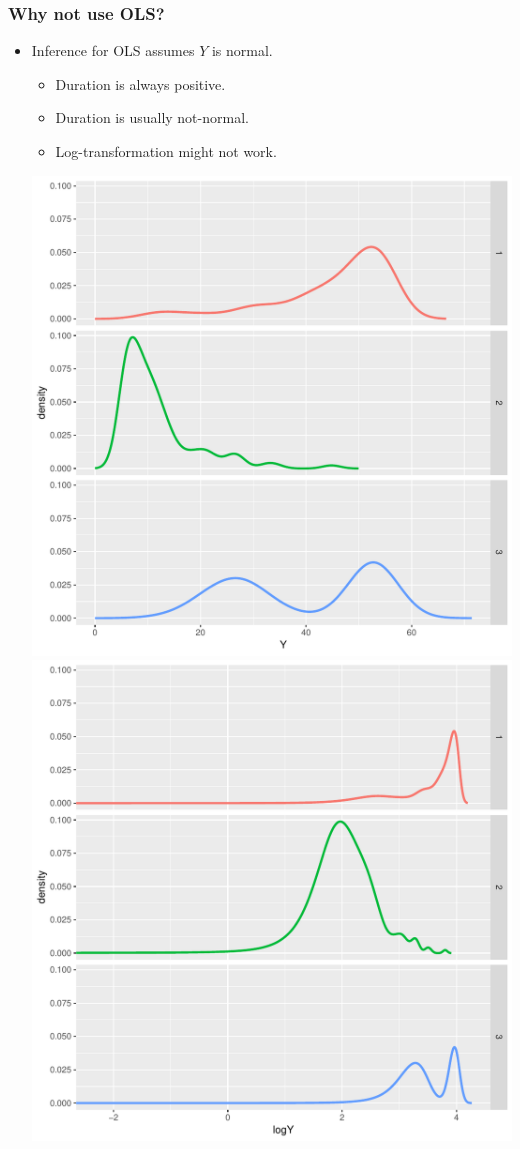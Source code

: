 \documentclass[10pt]{beamer}\usepackage[]{graphicx}\usepackage[]{color}
\begin{document}
\begin{frame}
  \frametitle{Why not use OLS?}
  \begin{itemize}
  \item Inference for OLS assumes $Y$ is normal.
    \begin{itemize}
    \item Duration is always positive.
    \item Duration is usually not-normal.
    \item Log-transformation might not work.
    \end{itemize}
    \centering
    \includegraphics[scale = .28]{note1-1}\hspace{.5cm}
    \includegraphics[scale = .28]{note1-2}
  \end{itemize}
\end{frame}
\end{document}
